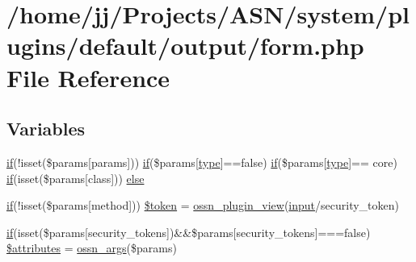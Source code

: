 \hypertarget{form_8php}{}\section{/home/jj/\+Projects/\+A\+S\+N/system/plugins/default/output/form.php File Reference}
\label{form_8php}
\subsection*{Variables}
\begin{DoxyCompactItemize}
\item 
\hyperlink{jquery_8tokeninput_8js_ad8dd46a3cbc004569e34401e9e71771a}{if}(!isset(\$params\mbox{[}\textquotesingle{}params\textquotesingle{}\mbox{]})) \hyperlink{jquery_8tokeninput_8js_ad8dd46a3cbc004569e34401e9e71771a}{if}(\$params\mbox{[}\textquotesingle{}\hyperlink{_ossn_wall_2actions_2wall_2post_2group_8php_a2dc1bb4e1ed0029daa81ac0776b14b51}{type}\textquotesingle{}\mbox{]}==false) \hyperlink{jquery_8tokeninput_8js_ad8dd46a3cbc004569e34401e9e71771a}{if}(\$params\mbox{[}\textquotesingle{}\hyperlink{_ossn_wall_2actions_2wall_2post_2group_8php_a2dc1bb4e1ed0029daa81ac0776b14b51}{type}\textquotesingle{}\mbox{]}== \textquotesingle{}core\textquotesingle{}) \hyperlink{jquery_8tokeninput_8js_ad8dd46a3cbc004569e34401e9e71771a}{if}(isset(\$params\mbox{[}\textquotesingle{}class\textquotesingle{}\mbox{]})) \hyperlink{form_8php_a9655f79c6c68c05eece5f6e3d1b3df9b}{else}
\item 
\hyperlink{jquery_8tokeninput_8js_ad8dd46a3cbc004569e34401e9e71771a}{if}(!isset(\$params\mbox{[}\textquotesingle{}method\textquotesingle{}\mbox{]})) \hyperlink{form_8php_a146c054d862f83f17814a8cb71610f56}{\$token} = \hyperlink{ossn_8lib_8plugins_8php_a09131ff3382e758ec6dba7bb2ea3ae32}{ossn\+\_\+plugin\+\_\+view}(\textquotesingle{}\hyperlink{ossn_8lib_8input_8php_a64ebee98b041c4f75f71ed3cd73cc8ed}{input}/security\+\_\+token\textquotesingle{})
\item 
\hyperlink{jquery_8tokeninput_8js_ad8dd46a3cbc004569e34401e9e71771a}{if}(isset(\$params\mbox{[}\textquotesingle{}security\+\_\+tokens\textquotesingle{}\mbox{]})\&\&\$params\mbox{[}\textquotesingle{}security\+\_\+tokens\textquotesingle{}\mbox{]}===false) \hyperlink{form_8php_a01f7286089be6e856e72206f4e7c619d}{\$attributes} = \hyperlink{ossn_8lib_8views_8php_a90922f09de8a06ea85351afb51fac9f7}{ossn\+\_\+args}(\$params)
\end{DoxyCompactItemize}


